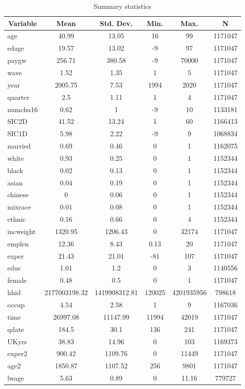 
\begin{table}[htbp]\centering \caption{Summary statistics \label{sumstats}}
\begin{tabular}{l c c c c c}\hline\hline
\multicolumn{1}{c}{\textbf{Variable}} & \textbf{Mean}
 & \textbf{Std. Dev.}& \textbf{Min.} &  \textbf{Max.} & \textbf{N}\\ \hline
age & 40.99 & 13.05 & 16 & 99 & 1171047\\
edage & 19.57 & 13.02 & -9 & 97 & 1171047\\
paygw & 256.71 & 380.58 & -9 & 70000 & 1171047\\
wave & 1.52 & 1.35 & 1 & 5 & 1171047\\
year & 2005.75 & 7.53 & 1994 & 2020 & 1171047\\
quarter & 2.5 & 1.11 & 1 & 4 & 1171047\\
numchu16 & 0.62 & 1 & -9 & 10 & 1133181\\
SIC2D & 41.52 & 13.24 & 1 & 60 & 1166413\\
SIC1D & 5.98 & 2.22 & -9 & 9 & 1068834\\
married & 0.69 & 0.46 & 0 & 1 & 1162075\\
white & 0.93 & 0.25 & 0 & 1 & 1152344\\
black & 0.02 & 0.13 & 0 & 1 & 1152344\\
asian & 0.04 & 0.19 & 0 & 1 & 1152344\\
chinese & 0 & 0.06 & 0 & 1 & 1152344\\
mixrace & 0.01 & 0.08 & 0 & 1 & 1152344\\
ethnic & 0.16 & 0.66 & 0 & 4 & 1152344\\
incweight & 1320.95 & 1206.43 & 0 & 32174 & 1171047\\
emplen & 12.36 & 8.43 & 0.13 & 20 & 1171047\\
exper & 21.43 & 21.01 & -81 & 107 & 1171047\\
educ & 1.01 & 1.2 & 0 & 3 & 1140556\\
female & 0.48 & 0.5 & 0 & 1 & 1171047\\
hhid & 2177003198.32 & 1419908312.81 & 120025 & 4201935956 & 798618\\
occup & 4.54 & 2.58 & 1 & 9 & 1167036\\
time & 26997.08 & 11147.99 & 11994 & 42019 & 1171047\\
qdate & 184.5 & 30.1 & 136 & 241 & 1171047\\
UKyrs & 38.83 & 14.96 & 0 & 103 & 1169373\\
exper2 & 900.42 & 1109.76 & 0 & 11449 & 1171047\\
age2 & 1850.87 & 1107.52 & 256 & 9801 & 1171047\\
lwage & 5.63 & 0.89 & 0 & 11.16 & 779727\\
\hline\end{tabular}
\end{table}
